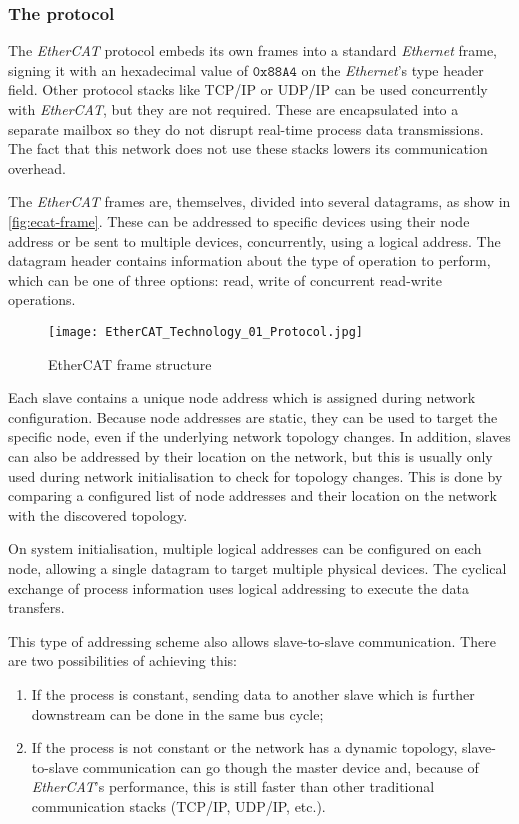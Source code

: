 \subsubsection{The protocol}

The \emph{EtherCAT} protocol embeds its own frames into a standard \emph{Ethernet} frame, signing it with an hexadecimal value of $\mathtt{0x88A4}$ on the \emph{Ethernet}'s type header field.
Other protocol stacks like TCP/IP or UDP/IP can be used concurrently with \emph{EtherCAT}, but they are not required.
These are encapsulated into a separate mailbox so they do not disrupt real-time process data transmissions.
The fact that this network does not use these stacks lowers its communication overhead.

The \emph{EtherCAT} frames are, themselves, divided into several datagrams, as show in \autoref{fig:ecat-frame}.
These can be addressed to specific devices using their node address or be sent to multiple devices, concurrently, using a logical address.
The datagram header contains information about the type of operation to perform, which can be one of three options: read, write of concurrent read-write operations.

\begin{figure}[htp]
	\centering
	\texttt{[image: EtherCAT\_Technology\_01\_Protocol.jpg]}
	\caption{EtherCAT frame structure}
	\label{fig:ecat-frame}
\end{figure}

Each slave contains a unique node address which is assigned during network configuration.
Because node addresses are static, they can be used to target the specific node, even if the underlying network topology changes.
In addition, slaves can also be addressed by their location on the network, but this is usually only used during network initialisation to check for topology changes.
This is done by comparing a configured list of node addresses and their location on the network with the discovered topology.

On system initialisation, multiple logical addresses can be configured on each node, allowing a single datagram to target multiple physical devices.
The cyclical exchange of process information uses logical addressing to execute the data transfers.

This type of addressing scheme also allows slave-to-slave communication.
There are two possibilities of achieving this:
\begin{enumerate}
	\item If the process is constant, sending data to another slave which is further downstream can be done in the same bus cycle;
	\item If the process is not constant or the network has a dynamic topology, slave-to-slave communication can go though the master device and, because of \emph{EtherCAT}'s performance, this is still faster than other traditional communication stacks (TCP/IP, UDP/IP, etc.).
\end{enumerate}
